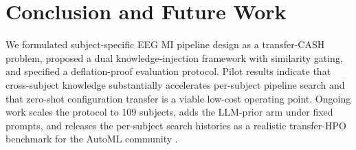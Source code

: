 \documentclass[conference]{IEEEtran}
\begin{document}
\section{Conclusion and Future Work}
\label{sec:conclusion}

We formulated subject-specific EEG MI pipeline design as a transfer-CASH problem, proposed a dual knowledge-injection framework with similarity gating, and specified a deflation-proof evaluation protocol. Pilot results indicate that cross-subject knowledge substantially accelerates per-subject pipeline search and that zero-shot configuration transfer is a viable low-cost operating point. Ongoing work scales the protocol to 109 subjects, adds the LLM-prior arm under fixed prompts, and releases the per-subject search histories as a realistic transfer-HPO benchmark for the AutoML community \cite{EggenspergerEtAl2021}.




\end{document}
